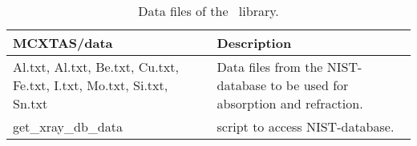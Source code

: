 %
\begin{table}
  \begin{center}
    {\let\my=\\
    \begin{tabular}{|p{}|p{}|}
      \hline
       {\bfseries MCXTAS/data} & Description \\
       \hline
 Al.txt, Al.txt, Be.txt, Cu.txt, Fe.txt, I.txt, Mo.txt, Si.txt, Sn.txt & Data files from the NIST-database to be used for absorption and refraction.\\
 get\_xray\_db\_data & script to access NIST-database.\\  
\hline
    \end{tabular}
    \caption{Data files of the \MCX\ library.}
    \label{t:comp-data}
    }
  \end{center}
\end{table}

